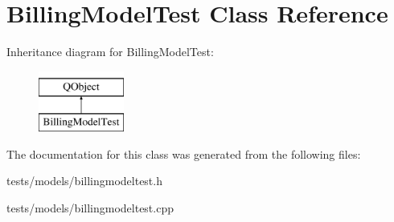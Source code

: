 \hypertarget{classBillingModelTest}{}\section{Billing\+Model\+Test Class Reference}
\label{classBillingModelTest}
Inheritance diagram for Billing\+Model\+Test\+:\begin{figure}[H]
\begin{center}
\leavevmode
\includegraphics[height=2.000000cm]{dc/d0c/classBillingModelTest}
\end{center}
\end{figure}


The documentation for this class was generated from the following files\+:\begin{DoxyCompactItemize}
\item 
tests/models/billingmodeltest.\+h\item 
tests/models/billingmodeltest.\+cpp\end{DoxyCompactItemize}
